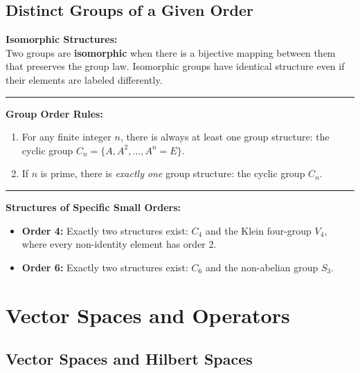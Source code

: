 \documentclass[11pt, a4paper]{report}
\begin{document}
\section{Distinct Groups of a Given Order}

\textbf{Isomorphic Structures:} \\
Two groups are \textbf{isomorphic} when there is a bijective mapping between them that preserves the group law. Isomorphic groups have identical structure even if their elements are labeled differently.

\vspace{1em}
\hrule
\vspace{1em}

\textbf{Group Order Rules:} \\
\begin{enumerate}
    \item For any finite integer $n$, there is always at least one group structure: the cyclic group $C_n = \{A, A^2, \dots, A^n = E\}$.
    \item If $n$ is prime, there is \textit{exactly one} group structure: the cyclic group $C_n$.
\end{enumerate}

\vspace{1em}
\hrule
\vspace{1em}

\textbf{Structures of Specific Small Orders:} \\
\begin{itemize}
    \item \textbf{Order 4:} Exactly two structures exist: $C_4$ and the Klein four-group $V_4$, where every non-identity element has order 2.
    \item \textbf{Order 6:} Exactly two structures exist: $C_6$ and the non-abelian group $S_3$.
\end{itemize}

\newpage
\chapter{Vector Spaces and Operators}
\section{Vector Spaces and Hilbert Spaces}
\end{document}
